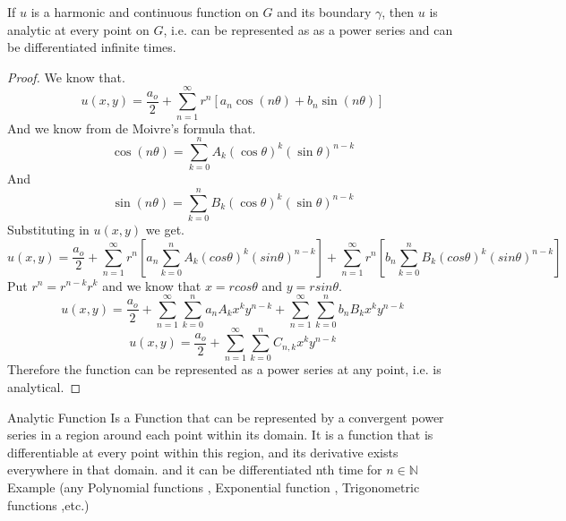 \documentclass[]{article}
\begin{document}
\begin{theorem}
    If $u$ is a harmonic and continuous function on $G$ and its boundary $\gamma$, then $u$ is analytic at every point on $G$, i.e. can be represented as as a power series and can be differentiated infinite times.    
\end{theorem}
\begin{proof}
    We know that.       
    \[
        u(x,y) = \frac{a_o}{2} + \sum_{n=1}^{\infty} r^n[a_n \cos(n\theta)+b_n \sin(n\theta)]    
    \]
    And we know from de Moivre's formula that.
    \[
        \cos(n\theta) = \sum_{k=0}^{n} A_k {(\cos\theta)}^k {(\sin\theta)}^{n-k}    
    \]
    And
    \[
        \sin(n\theta) =  \sum_{k=0}^{n} B_k {(\cos\theta)}^k {(\sin\theta)}^{n-k}    
    \]
    Substituting in $u(x,y)$ we get.
    \[
        u(x,y) = \frac{a_o}{2} + \sum_{n=1}^{\infty} r^n\left[a_n\sum_{k=0}^{n} A_k (cos\theta)^k (sin\theta)^{n-k}\right] + \sum_{n=1}^{\infty} r^n\left[b_n\sum_{k=0}^{n} B_k (cos\theta)^k (sin\theta)^{n-k}\right]    
    \]
    Put $r^n = r^{n-k}r^k $ and we know that $x = rcos\theta$ and $y=rsin\theta$.
    \[
        u(x,y) = \frac{a_o}{2} + \sum_{n=1}^{\infty}\sum_{k=0}^{n} a_n A_k x^k y^{n-k} + \sum_{n=1}^{\infty}\sum_{k=0}^{n}b_n B_k x^k y^{n-k}    
    \]
    \[
        u(x,y) = \frac{a_o}{2} + \sum_{n=1}^{\infty}\sum_{k=0}^{n} C_{n,k} x^k y^{n-k}
    \]
    Therefore the function can be represented as a power series at any point, i.e. is analytical.
\end{proof}
\begin{minipage}[b]{1\textwidth}
    \begin{enrichment*}{Analytic Function}
        Is a Function that can be represented by a convergent power series in a region around each point within its domain. It is a function that is differentiable at every point within this region, and its derivative exists everywhere in that domain. 
        and it can be differentiated nth time for $n \in \mathbb{N}$
        \\
        Example (any Polynomial functions , Exponential function , Trigonometric functions ,etc.)
    \end{enrichment*}        
\end{minipage}
\newpage
\setcounter{equation}{0}
\end{document}
